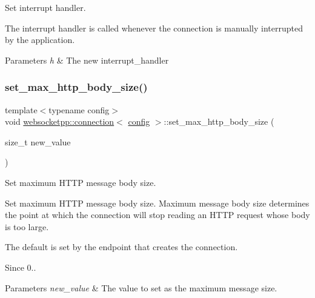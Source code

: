 Set interrupt handler. 

The interrupt handler is called whenever the connection is manually interrupted by the application.


\begin{DoxyParams}{Parameters}
{\em h} & The new interrupt\+\_\+handler \\
\hline
\end{DoxyParams}
\mbox{\label{classwebsocketpp_1_1connection_ad2a5b06ad88f5bcdd06fcabaae3323bc}} 
\subsubsection{\texorpdfstring{set\+\_\+max\+\_\+http\+\_\+body\+\_\+size()}{set\_max\_http\_body\_size()}}
{\footnotesize\ttfamily template$<$typename config$>$ \\
void \mbox{\hyperlink{classwebsocketpp_1_1connection}{websocketpp\+::connection}}$<$ \mbox{\hyperlink{classconfig}{config}} $>$\+::set\+\_\+max\+\_\+http\+\_\+body\+\_\+size (\begin{DoxyParamCaption}\item[{size\+\_\+t}]{new\+\_\+value }\end{DoxyParamCaption})\hspace{0.3cm}{\ttfamily [inline]}}



Set maximum H\+T\+TP message body size. 

Set maximum H\+T\+TP message body size. Maximum message body size determines the point at which the connection will stop reading an H\+T\+TP request whose body is too large.

The default is set by the endpoint that creates the connection.

\begin{DoxySince}{Since}
0..
\end{DoxySince}

\begin{DoxyParams}{Parameters}
{\em new\+\_\+value} & The value to set as the maximum message size. \\
\hline
\end{DoxyParams}
\mbox{\label{classwebsocketpp_1_1connection_a522286bf83373f87ddebf93b732abffc}} 
